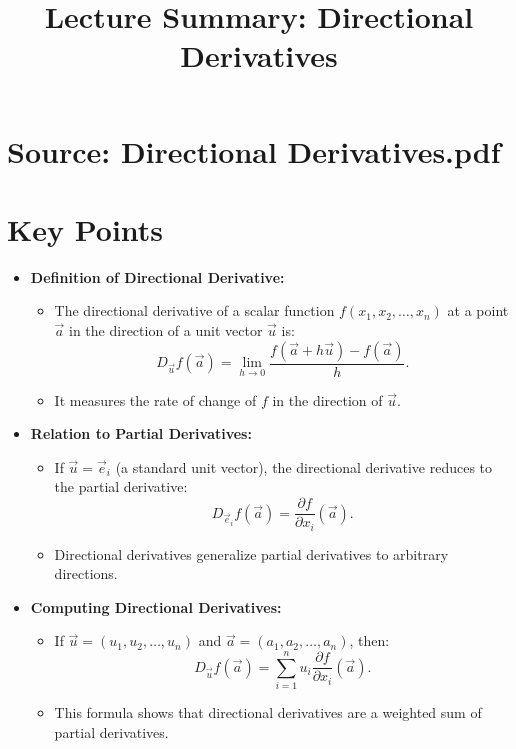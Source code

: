 \documentclass{article}
\title{Lecture Summary: Directional Derivatives}
\author{}
\date{}
\begin{document}
\maketitle

\section*{Source: Directional Derivatives.pdf}

\section*{Key Points}

\begin{itemize}
  \item \textbf{Definition of Directional Derivative:}
    \begin{itemize}
      \item The directional derivative of a scalar function $f(x_1, x_2, \dots, x_n)$ at a point $\vec{a}$ in the direction of a unit vector $\vec{u}$ is:
        \[
          D_{\vec{u}} f(\vec{a}) = \lim_{h \to 0} \frac{f(\vec{a} + h \vec{u}) - f(\vec{a})}{h}.
        \]
      \item It measures the rate of change of $f$ in the direction of $\vec{u}$.
    \end{itemize}

  \item \textbf{Relation to Partial Derivatives:}
    \begin{itemize}
      \item If $\vec{u} = \vec{e}_i$ (a standard unit vector), the directional derivative reduces to the partial derivative:
        \[
          D_{\vec{e}_i} f(\vec{a}) = \frac{\partial f}{\partial x_i}(\vec{a}).
        \]
      \item Directional derivatives generalize partial derivatives to arbitrary directions.
    \end{itemize}

  \item \textbf{Computing Directional Derivatives:}
    \begin{itemize}
      \item If $\vec{u} = (u_1, u_2, \dots, u_n)$ and $\vec{a} = (a_1, a_2, \dots, a_n)$, then:
        \[
          D_{\vec{u}} f(\vec{a}) = \sum_{i=1}^n u_i \frac{\partial f}{\partial x_i}(\vec{a}).
        \]
      \item This formula shows that directional derivatives are a weighted sum of partial derivatives.
    \end{itemize}


\end{itemize}
\end{document}
